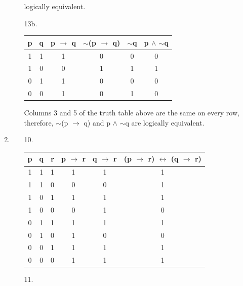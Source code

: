 \documentclass[12pt]{article}
\begin{document}
\begin{enumerate}[label = \alph*)]
\begin{itemize}
                logically equivalent.
            \item [13b.]
                \vspace{2em}
                \begin{tabular}{cc|c|c|c|c}
                    p & q & p $\rightarrow$ q & $\sim$(p $\rightarrow$ q) &
                            $\sim$q & p $\wedge$ $\sim$q \\
                    \hline
                    1 & 1 & 1 & 0 & 0 & 0 \\
                    1 & 0 & 0 & 1 & 1 & 1 \\
                    0 & 1 & 1 & 0 & 0 & 0 \\
                    0 & 0 & 1 & 0 & 1 & 0 \\
                \end{tabular}
            \item []
                \vspace{1em}
                Columns 3 and 5 of the truth table above are the same on every
                row, therefore, $\sim$(p $\rightarrow$ q) and  p $\wedge$ $\sim$q
                are logically equivalent.
        \end{itemize}
    \item
        \begin{itemize}
            \item [10.]
                \begin{tabular}{ccc|c|c|c}
                    p & q & r & p $\rightarrow$ r & q $\rightarrow$ r & 
                            (p $\rightarrow$ r) $\leftrightarrow$ (q $\rightarrow$ r) \\
                    \hline
                    1 & 1 & 1 & 1 & 1 & 1 \\
                    1 & 1 & 0 & 0 & 0 & 1 \\
                    1 & 0 & 1 & 1 & 1 & 1 \\
                    1 & 0 & 0 & 0 & 1 & 0 \\
                    0 & 1 & 1 & 1 & 1 & 1 \\
                    0 & 1 & 0 & 1 & 0 & 0 \\
                    0 & 0 & 1 & 1 & 1 & 1 \\
                    0 & 0 & 0 & 1 & 1 & 1 \\
                \end{tabular}
            \item [11.]
                \vspace{2em}

\end{itemize}
\end{enumerate}
\end{document}
